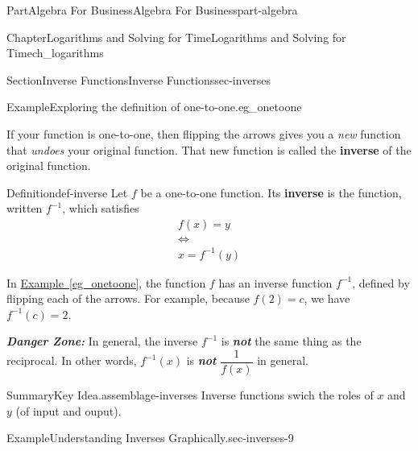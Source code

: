 \documentclass[oneside,10pt,]{tufte-book}
\newcommand{\xreffont}{\relax}
\newcommand{\alert}[1]{\textbf{\textit{#1}}}
\newcommand{\terminology}[1]{\textbf{#1}}
\numberwithin{equation}{chapter}
\begin{document}
\begin{partptx}{Part}{Algebra For Business}{}{Algebra For Business}{}{}{part-algebra}
\begin{chapterptx}{Chapter}{Logarithms and Solving for Time}{}{Logarithms and Solving for Time}{}{}{ch_logarithms}
\begin{sectionptx}{Section}{Inverse Functions}{}{Inverse Functions}{}{}{sec-inverses}
\begin{example}{Example}{Exploring the definition of one-to-one.}{eg_onetoone}
\begin{image}{0}{1}{0}{}
{
\qquad
{}
}%
\end{image}%
\end{example}
If your function is one-to-one, then flipping the arrows gives you a \emph{new} function that \emph{undoes} your original function. That new function is called the \terminology{inverse} of the original function.%
\begin{definition}{Definition}{}{def-inverse}%
Let \(f\) be a one-to-one function. Its \terminology{inverse} is the function, written \(f^{-1}\), which satisfies%
\begin{gather*}
f(x)   =    y \\
\iff      \\
x     =    f^{-1}(y) 
\end{gather*}
%
\end{definition}
In \hyperref[eg_onetoone]{Example~{\xreffont\ref{eg_onetoone}}}, the function \(f\) has an inverse function \(f^{-1}\), defined by flipping each of the arrows. For example, because \(f(2) = c\), we have \(f^{-1}(c) = 2\).%
\par
\alert{Danger Zone:} In general, the inverse \(f^{-1}\) is \alert{not} the same thing as the reciprocal.  In other words, \(f^{-1}(x)\) is \alert{not} \(\dfrac{1}{f(x)}\) in general.%
\begin{assemblage}{Summary}{Key Idea.}{assemblage-inverses}%
Inverse functions swich the roles of \(x\) and \(y\) (of input and ouput).%
\end{assemblage}
\begin{example}{Example}{Understanding Inverses Graphically.}{sec-inverses-9}%

\end{example}
\end{sectionptx}
\end{chapterptx}
\end{partptx}
\end{document}
